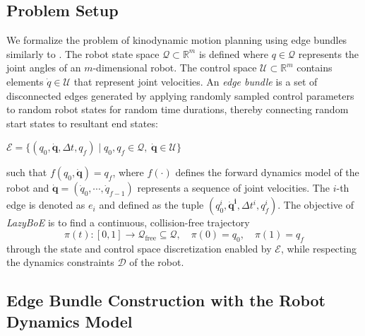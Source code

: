 \subsection{Problem Setup}
\label{sec:multiquery:bundles}

We formalize the problem of kinodynamic motion planning using edge bundles similarly to \cite{shome2021asymptotically}.
The robot state space $\mathcal{Q} \subset \mathbb{R}^m$ is defined where $q \in \mathcal{Q}$ represents the joint angles of an $m$-dimensional robot. The control space $\mathcal{U} \subset \mathbb{R}^m$ contains elements $\dot{q} \in \mathcal{U}$ that represent joint velocities.
An \textsl{edge bundle} is a set of disconnected edges generated by applying randomly sampled control parameters to random robot states for random time durations, thereby connecting random start states to resultant end states:
\begin{center}
$\mathcal{E} = \{(q_0, \boldsymbol{\dot{q}}, \Delta t, q_f) \mid q_0, q_f \in \mathcal{Q}, \hspace{3pt} \boldsymbol{\dot{q}} \in \mathcal{U}\}$
\end{center}
such that $f(q_0, \boldsymbol{\dot{q}}) = q_f$, where $f(\cdot)$ defines the forward dynamics model of the robot and $\boldsymbol{\dot{q}} = (\dot{q}_0, \cdots, \dot{q}_{f-1})$ represents a sequence of joint velocities. The $i$-th edge is denoted as $e_i$ and defined as the tuple $(q_0^i, \boldsymbol{\dot{q}^i}, \Delta t^i, q_f^i)$.
The objective of \textsl{LazyBoE} is to find a continuous, collision-free trajectory
$$\pi(t) : [0,1] \rightarrow \mathcal{Q}_{\text{free}} \subseteq \mathcal{Q}, \quad \pi(0) = q_0, \quad \pi(1) = q_f$$
through the state and control space discretization enabled by $\mathcal{E}$, while respecting the dynamics constraints $\mathcal{D}$ of the robot.

\subsection{Edge Bundle Construction with the Robot Dynamics Model}
\label{sec:multiquery:edges}

